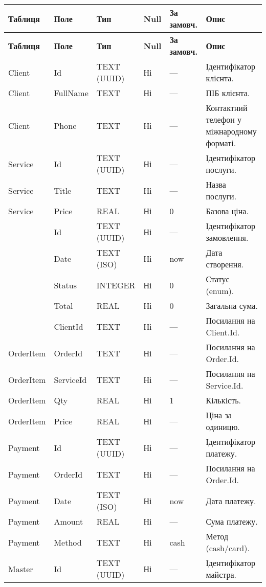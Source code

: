 \documentclass[14pt,a4paper]{extarticle}
\begin{document}
\begin{longtable}{@{}p{2.8cm} p{3.2cm} p{3.2cm} p{2.0cm} p{3.2cm} p{8.2cm}@{}}
\toprule
\textbf{Таблиця} & \textbf{Поле} & \textbf{Тип} & \textbf{Null} & \textbf{За замовч.} & \textbf{Опис}\\
\midrule
\endfirsthead
\toprule
\textbf{Таблиця} & \textbf{Поле} & \textbf{Тип} & \textbf{Null} & \textbf{За замовч.} & \textbf{Опис}\\
\midrule
\endhead
Client & Id & TEXT (UUID) & Ні & — & Ідентифікатор клієнта. \\
Client & FullName & TEXT & Ні & — & ПІБ клієнта. \\
Client & Phone & TEXT & Ні & — & Контактний телефон у міжнародному форматі. \\
\addlinespace
Service & Id & TEXT (UUID) & Ні & — & Ідентифікатор послуги. \\
Service & Title & TEXT & Ні & — & Назва послуги. \\
Service & Price & REAL & Ні & 0 & Базова ціна. \\
\addlinespace
[Order] & Id & TEXT (UUID) & Ні & — & Ідентифікатор замовлення. \\
[Order] & Date & TEXT (ISO) & Ні & now & Дата створення. \\
[Order] & Status & INTEGER & Ні & 0 & Статус (enum). \\
[Order] & Total & REAL & Ні & 0 & Загальна сума. \\
[Order] & ClientId & TEXT & Ні & — & Посилання на Client.Id. \\
\addlinespace
OrderItem & OrderId & TEXT & Ні & — & Посилання на Order.Id. \\
OrderItem & ServiceId & TEXT & Ні & — & Посилання на Service.Id. \\
OrderItem & Qty & REAL & Ні & 1 & Кількість. \\
OrderItem & Price & REAL & Ні & — & Ціна за одиницю. \\
\addlinespace
Payment & Id & TEXT (UUID) & Ні & — & Ідентифікатор платежу. \\
Payment & OrderId & TEXT & Ні & — & Посилання на Order.Id. \\
Payment & Date & TEXT (ISO) & Ні & now & Дата платежу. \\
Payment & Amount & REAL & Ні & — & Сума платежу. \\
Payment & Method & TEXT & Ні & cash & Метод (cash/card). \\
\addlinespace
Master & Id & TEXT (UUID) & Ні & — & Ідентифікатор майстра. \\

\end{longtable}
\end{document}
